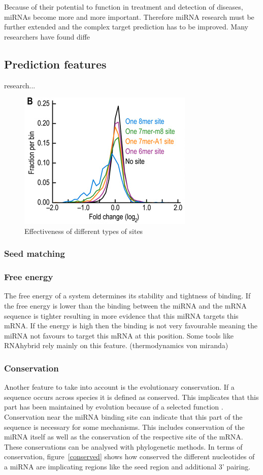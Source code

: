 \documentclass[12pt]{article}
\begin{document}
Because of their potential to function in treatment and detection of diseases, miRNAs become more and more important. Therefore miRNA research must be further extended and the complex target prediction has to be improved. Many researchers have found diffe

\subsection{Prediction features}

research...


\begin{figure}[h]
\centering
\includegraphics[scale=0.6]{results/site_3addi.png}
\caption{Effectiveness of different types of sites}
\label{types}
\end{figure}


\subsubsection{Seed matching}


\subsubsection{Free energy}
The free energy of a system determines its stability and tightness of binding. If the free energy is lower than the binding between the miRNA and the mRNA sequence is tighter resulting in more evidence that this miRNA targets this mRNA. If the energy is high then the binding is not very favourable meaning the miRNA not favours to target this mRNA at this position. Some tools like RNAhybrid \cite{Rehmsmeier} rely mainly on this feature. (thermodynamics von miranda)
 
\subsubsection{Conservation}
Another feature to take into account is the evolutionary conservation. If a sequence occurs across species it is defined as conserved. This implicates that this part has been maintained by evolution because of a selected function \cite{Peterson}. Conservation near the miRNA binding site can indicate that this part of the sequence is necessary for some mechanisms. This includes conservation of the miRNA itself as well as the conservation of the respective site of the mRNA. These conservations can be analysed with phylogenetic methods. In terms of conservation, figure~\ref{conserved} shows how conserved the different nucleotides of a miRNA are implicating regions like the seed region and additional 3' pairing. 
\end{document}
